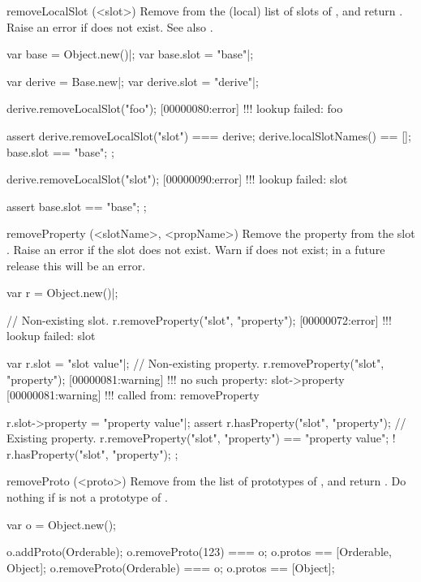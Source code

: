 \begin{urbiscriptapi}
\item[removeLocalSlot](<slot>)%
  Remove  from the (local) list of slots of \this, and return
  \this.  Raise an error if  does not exist.  See also
  .
\begin{urbiscript}
var base = Object.new()|;
var base.slot = "base"|;

var derive = Base.new|;
var derive.slot = "derive"|;

derive.removeLocalSlot("foo");
[00000080:error] !!! lookup failed: foo

assert
{
  derive.removeLocalSlot("slot") === derive;
  derive.localSlotNames() == [];
  base.slot == "base";
};

derive.removeLocalSlot("slot");
[00000090:error] !!! lookup failed: slot

assert
{
  base.slot == "base";
};
\end{urbiscript}


\item[removeProperty](<slotName>, <propName>)%
  Remove the property  from the slot .  Raise an
  error if the slot does not exist.  Warn if  does not exist;
  in a future release this will be an error.
\begin{urbiscript}
var r = Object.new()|;

// Non-existing slot.
r.removeProperty("slot", "property");
[00000072:error] !!! lookup failed: slot

var r.slot = "slot value"|;
// Non-existing property.
r.removeProperty("slot", "property");
[00000081:warning] !!! no such property: slot->property
[00000081:warning] !!!    called from: removeProperty

r.slot->property = "property value"|;
assert
{
  r.hasProperty("slot", "property");
  // Existing property.
  r.removeProperty("slot", "property") == "property value";
  ! r.hasProperty("slot", "property");
};
\end{urbiscript}


\item[removeProto](<proto>)%
  Remove  from the list of prototypes of \this, and return \this.
  Do nothing if  is not a prototype of \this.
\begin{urbiassert}
var o = Object.new();

o.addProto(Orderable);
o.removeProto(123) === o;
o.protos == [Orderable, Object];
o.removeProto(Orderable) === o;
o.protos == [Object];
\end{urbiassert}



\end{urbiscriptapi}
